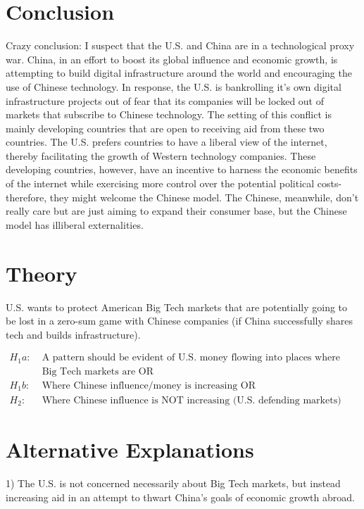 \section*{Conclusion}
Crazy conclusion: I suspect that the U.S. and China are in a technological proxy war. China, in an effort to boost its global influence and economic growth, is attempting to build digital infrastructure around the world and encouraging the use of Chinese technology. In response, the U.S. is bankrolling it's own digital infrastructure projects out of fear that its companies will be locked out of markets that subscribe to Chinese technology. The setting of this conflict is mainly developing countries that are open to receiving aid from these two countries. The U.S. prefers countries to have a liberal view of the internet, thereby facilitating the growth of Western technology companies. These developing countries, however, have an incentive to harness the economic benefits of the internet while exercising more control over the potential political costs- therefore, they might welcome the Chinese model. The Chinese, meanwhile, don't really care but are just aiming to expand their consumer base, but the Chinese model has illiberal externalities.

\section*{Theory} 
U.S. wants to protect American Big Tech markets that are potentially going to be lost in a zero-sum game with Chinese companies (if China successfully shares tech and builds infrastructure).

\begin{align*}
    H_1a:\; & \text{A pattern should be evident of U.S. money flowing into places where either}\\
    & \text{Big Tech markets are OR}\\
    H_1b:\; & \text{Where Chinese influence/money is increasing OR}\\
    H_2:\; & \text{Where Chinese influence is NOT increasing (U.S. defending markets)}
\end{align*}

\section*{Alternative Explanations}
1) The U.S. is not concerned necessarily about Big Tech markets, but instead increasing aid in an attempt to thwart China's goals of economic growth abroad.

